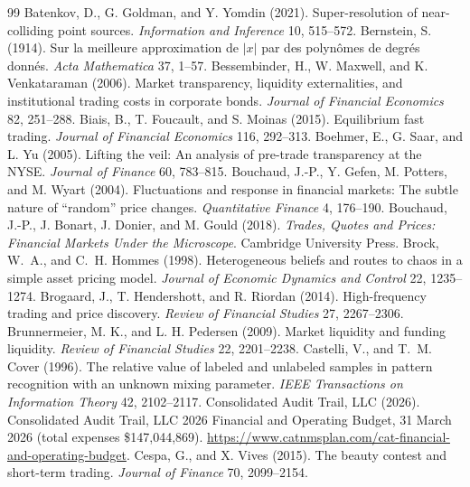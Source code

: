 \documentclass[12pt]{article}
\theoremstyle{definition}
\theoremstyle{remark}
\begin{document}
\begin{thebibliography}{99}
 Batenkov, D., G. Goldman, and Y. Yomdin (2021). Super-resolution of near-colliding point sources. \emph{Information and Inference} 10, 515--572.
 Bernstein, S. (1914). Sur la meilleure approximation de $|x|$ par des polyn\^omes de degr\'es donn\'es. \emph{Acta Mathematica} 37, 1--57.
 Bessembinder, H., W. Maxwell, and K. Venkataraman (2006). Market transparency, liquidity externalities, and institutional trading costs in corporate bonds. \emph{Journal of Financial Economics} 82, 251--288.
 Biais, B., T. Foucault, and S. Moinas (2015). Equilibrium fast trading. \emph{Journal of Financial Economics} 116, 292--313.
 Boehmer, E., G. Saar, and L. Yu (2005). Lifting the veil: An analysis of pre-trade transparency at the NYSE. \emph{Journal of Finance} 60, 783--815.
 Bouchaud, J.-P., Y. Gefen, M. Potters, and M. Wyart (2004). Fluctuations and response in financial markets: The subtle nature of ``random'' price changes. \emph{Quantitative Finance} 4, 176--190.
 Bouchaud, J.-P., J. Bonart, J. Donier, and M. Gould (2018). \emph{Trades, Quotes and Prices: Financial Markets Under the Microscope}. Cambridge University Press.
 Brock, W.~A., and C.~H. Hommes (1998). Heterogeneous beliefs and routes to chaos in a simple asset pricing model. \emph{Journal of Economic Dynamics and Control} 22, 1235--1274.
 Brogaard, J., T. Hendershott, and R. Riordan (2014). High-frequency trading and price discovery. \emph{Review of Financial Studies} 27, 2267--2306.
 Brunnermeier, M. K., and L. H. Pedersen (2009). Market liquidity and funding liquidity. \emph{Review of Financial Studies} 22, 2201--2238.
 Castelli, V., and T.~M. Cover (1996). The relative value of labeled and unlabeled samples in pattern recognition with an unknown mixing parameter. \emph{IEEE Transactions on Information Theory} 42, 2102--2117.
 Consolidated Audit Trail, LLC (2026). Consolidated Audit Trail, LLC 2026 Financial and Operating Budget, 31 March 2026 (total expenses \$147{,}044{,}869). \url{https://www.catnmsplan.com/cat-financial-and-operating-budget}.
 Cespa, G., and X. Vives (2015). The beauty contest and short-term trading. \emph{Journal of Finance} 70, 2099--2154.

\end{thebibliography}
\end{document}
